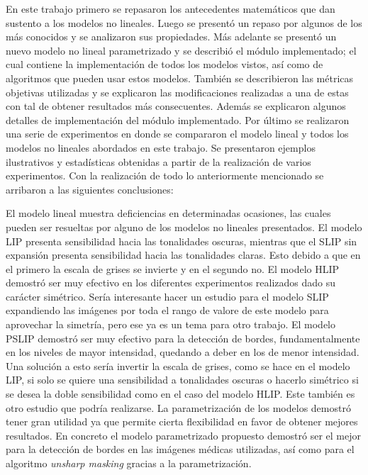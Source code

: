 \begin{conclusions}
    En este trabajo primero se repasaron los antecedentes matem\'aticos que dan sustento a los modelos no lineales. Luego se present\'o un repaso por algunos de los m\'as conocidos y se analizaron sus propiedades. M\'as adelante se present\'o un nuevo modelo no lineal parametrizado y se describi\'o el m\'odulo implementado; el cual contiene la implementaci\'on de todos los modelos vistos, as\'i como de algoritmos que pueden usar estos modelos. Tambi\'en se describieron las m\'etricas objetivas utilizadas y se explicaron las modificaciones realizadas a una de estas con tal de obtener resultados m\'as consecuentes. Adem\'as se explicaron algunos detalles de implementaci\'on del m\'odulo implementado. Por \'ultimo se realizaron una serie de experimentos en donde se compararon el modelo lineal y todos los modelos no lineales abordados en este trabajo. Se presentaron ejemplos ilustrativos y estad\'isticas obtenidas a partir de la realizaci\'on de varios experimentos. Con la realizaci\'on de todo lo anteriormente mencionado se arribaron a las siguientes conclusiones:
    
    El modelo lineal muestra deficiencias en determinadas ocasiones, las cuales pueden ser resueltas por alguno de los modelos no lineales presentados. El modelo LIP presenta sensibilidad hacia las tonalidades oscuras, mientras que el SLIP sin expansi\'on presenta sensibilidad hacia las tonalidades claras. Esto debido a que en el primero la escala de grises se invierte y en el segundo no. El modelo HLIP demostr\'o ser muy efectivo en los diferentes experimentos realizados dado su car\'acter sim\'etrico. Ser\'ia interesante hacer un estudio para el modelo SLIP expandiendo las im\'agenes por toda el rango de valore de este modelo para aprovechar la simetr\'ia, pero ese ya es un tema para otro trabajo. El modelo PSLIP demostr\'o ser muy efectivo para la detecci\'on de bordes, fundamentalmente en los niveles de mayor intensidad, quedando a deber en los de menor intensidad. Una soluci\'on a esto ser\'ia invertir la escala de grises, como se hace en el modelo LIP, si solo se quiere una sensibilidad a tonalidades oscuras o hacerlo sim\'etrico si se desea la doble sensibilidad como en el caso del modelo HLIP. Este tambi\'en es otro estudio que podr\'ia realizarse. La parametrizaci\'on de los modelos demostr\'o tener gran utilidad ya que permite cierta flexibilidad en favor de obtener mejores resultados. En concreto el modelo parametrizado propuesto demostr\'o ser el mejor para la detecci\'on de bordes en las im\'agenes m\'edicas utilizadas, as\'i como para el algoritmo \textit{unsharp masking} gracias a la parametrizaci\'on.
    

\end{conclusions}
